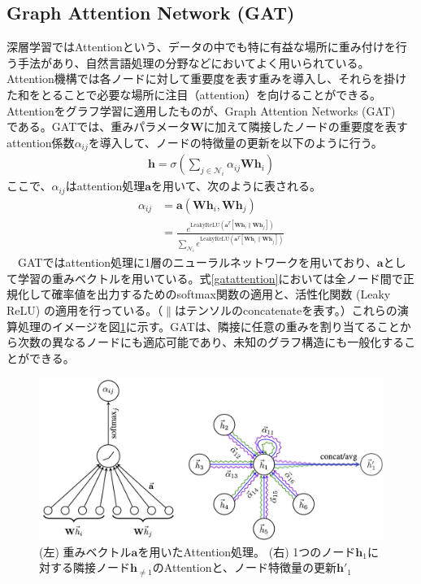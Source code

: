 \subsection{Graph Attention Network (GAT)}
\label{GATexplain}
深層学習ではAttentionという、データの中でも特に有益な場所に重み付けを行う手法があり、自然言語処理の分野などにおいてよく用いられている。Attention機構では各ノードに対して重要度を表す重みを導入し、それらを掛けた和をとることで必要な場所に注目（attention）を向けることができる。Attentionをグラフ学習に適用したものが、Graph Attention Networks (GAT) ~\cite{gat} である。GATでは、重みパラメータ$\bm{W}$に加えて隣接したノードの重要度を表すattention係数$\alpha_{ij}$を導入して、ノードの特徴量の更新を以下のように行う。
\begin{align}
\bm{h} = \sigma (\sum_{j \in \mathcal{N}_i} \alpha_{ij} \bm{W} \bm{h}_i )
\end{align}
ここで、$\alpha_{ij}$はattention処理$\bm{a}$を用いて、次のように表される。
\begin{align}
\alpha_{ij} &= \bm{a}(\bm{W}\bm{h}_i, \bm{W}\bm{h}_j)\\
 &= \frac{e^{\mathrm{LeakyReLU}(\bm{a}^T [ \bm{W}\bm{h}_i \parallel \bm{W}\bm{h}_j ])}}{\sum_{\mathcal{N}_i} e^{\mathrm{LeakyReLU}(\bm{a}^T [ \bm{W}\bm{h}_i \parallel  \bm{W}\bm{h}_j ])}}
\label{gatattention}
\end{align}
　GATではattention処理に1層のニューラルネットワークを用いており、$\bm{a}$として学習の重みベクトルを用いている。式\ref{gatattention}においては全ノード間で正規化して確率値を出力するためのsoftmax関数の適用と、活性化関数 (Leaky ReLU) の適用を行っている。（$\parallel$はテンソルのconcatenateを表す。）これらの演算処理のイメージを図\ref{gatt}に示す。GATは、隣接に任意の重みを割り当てることから次数の異なるノードにも適応可能であり、未知のグラフ構造にも一般化することができる。
\begin{figure}[H]
	\begin{center}
 \includegraphics[keepaspectratio, scale=0.25]
 	{Figure/Deeplearning/gat.png}
 		\caption[Graph Attention Network]{ (左) 重みベクトル$\bm{a}$を用いたAttention処理。 (右) 1つのノード$\bm{h}_1$に対する隣接ノード$\bm{h}_{\neq 1}$のAttentionと、ノード特徴量の更新$\bm{h'}_1$~\cite{gat}}
		\label{gatt}
	\end{center}
\end{figure}